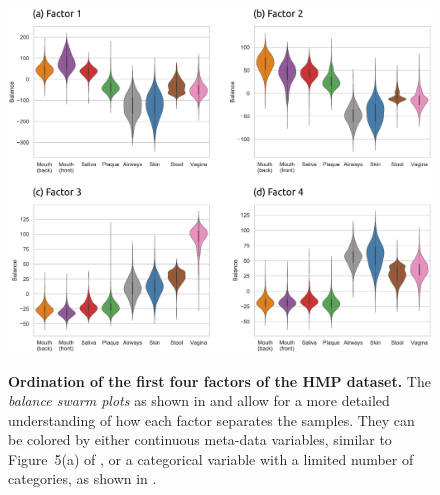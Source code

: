 \begin{figure}[!htb]
    \centering
     \includegraphics[width=\linewidth]{pdf/hmp_pf_all_violins.pdf}
    \begin{subfigure}{0pt}
        \label{fig:hmp_pf_all_violins:sub:factor_1}
    \end{subfigure}
    \begin{subfigure}{0pt}
        \label{fig:hmp_pf_all_violins:sub:factor_2}
    \end{subfigure}
    \begin{subfigure}{0pt}
        \label{fig:hmp_pf_all_violins:sub:factor_3}
    \end{subfigure}
    \begin{subfigure}{0pt}
        \label{fig:hmp_pf_all_violins:sub:factor_4}
    \end{subfigure}
    \caption[Ordination of the first four factors of the \ac{HMP} dataset]{
        \textbf{Ordination of the first four factors of the \ac{HMP} dataset.}
        The \emph{balance swarm plots} as shown in
         and
        allow for a more detailed understanding of how each factor separates the samples.
        They can be colored by either continuous meta-data variables, similar to Figure~5(a) of \cite{Washburne2017a},
        or a categorical variable with a limited number of categories, as shown in .
}
\end{figure}
